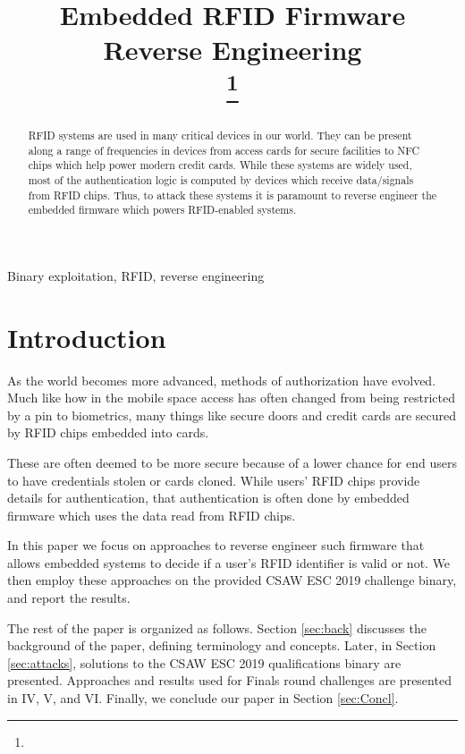 \documentclass[conference]{IEEEtran}
\begin{document}
\title{Embedded RFID Firmware Reverse Engineering\\
{\footnotesize \textsuperscript{}}
\thanks{}
}

\maketitle

\begin{abstract}

RFID systems are used in many critical devices in our world. They can be present along a range of frequencies in devices from access cards for secure facilities to NFC chips which  help power modern credit cards. While these systems are widely used, most of the authentication logic is computed by devices which receive data/signals from RFID chips. Thus, to attack these systems it is paramount to reverse engineer the embedded firmware which powers RFID-enabled systems.

\end{abstract}

\begin{IEEEkeywords}
Binary exploitation, RFID, reverse engineering
\end{IEEEkeywords}

\section{Introduction}
As the world becomes more advanced, methods of authorization have evolved. Much like how in the mobile space access has often changed from being restricted by a pin to biometrics, many things like secure doors and credit cards are secured by RFID chips embedded into cards.

These are often deemed to be more secure because of a lower chance for end users to have credentials stolen or cards cloned. While users' RFID chips provide details for authentication, that authentication is often done by embedded firmware which uses the data read from RFID chips.

In this paper we focus on approaches to reverse engineer such firmware that allows embedded systems to decide if a user's RFID identifier is valid or not. We then employ these approaches on the provided CSAW ESC 2019 challenge binary, and report the results.

The rest of the paper is organized as follows. Section \ref{sec:back} discusses the background of the paper, defining terminology and concepts. Later, in Section \ref{sec:attacks}, solutions to the CSAW ESC 2019 qualifications binary are presented. Approaches and results used for Finals round challenges are presented in IV, V, and VI. Finally, we conclude our paper in Section \ref{sec:Concl}.
\end{document}
